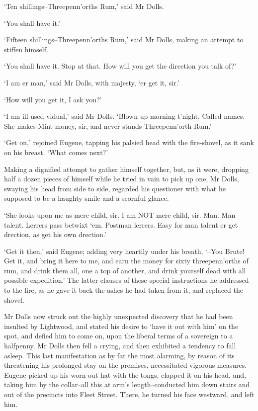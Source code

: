 ‘Ten shillings--Threepenn’orths Rum,’ said Mr Dolls.

‘You shall have it.’

‘Fifteen shillings--Threepenn’orths Rum,’ said Mr Dolls, making an
attempt to stiffen himself.

‘You shall have it. Stop at that. How will you get the direction you
talk of?’

‘I am er man,’ said Mr Dolls, with majesty, ‘er get it, sir.’

‘How will you get it, I ask you?’

‘I am ill-used vidual,’ said Mr Dolls. ‘Blown up morning t’night. Called
names. She makes Mint money, sir, and never stands Threepenn’orth Rum.’

‘Get on,’ rejoined Eugene, tapping his palsied head with the
fire-shovel, as it sank on his breast. ‘What comes next?’

Making a dignified attempt to gather himself together, but, as it were,
dropping half a dozen pieces of himself while he tried in vain to pick
up one, Mr Dolls, swaying his head from side to side, regarded his
questioner with what he supposed to be a haughty smile and a scornful
glance.

‘She looks upon me as mere child, sir. I am NOT mere child, sir. Man.
Man talent. Lerrers pass betwixt ‘em. Postman lerrers. Easy for man
talent er get drection, as get his own drection.’

‘Get it then,’ said Eugene; adding very heartily under his breath,
‘--You Brute! Get it, and bring it here to me, and earn the money for
sixty threepenn’orths of rum, and drink them all, one a top of another,
and drink yourself dead with all possible expedition.’ The latter
clauses of these special instructions he addressed to the fire, as he
gave it back the ashes he had taken from it, and replaced the shovel.

Mr Dolls now struck out the highly unexpected discovery that he had been
insulted by Lightwood, and stated his desire to ‘have it out with him’
on the spot, and defied him to come on, upon the liberal terms of
a sovereign to a halfpenny. Mr Dolls then fell a crying, and then
exhibited a tendency to fall asleep. This last manifestation as by far
the most alarming, by reason of its threatening his prolonged stay
on the premises, necessitated vigorous measures. Eugene picked up his
worn-out hat with the tongs, clapped it on his head, and, taking him by
the collar--all this at arm’s length--conducted him down stairs and out
of the precincts into Fleet Street. There, he turned his face westward,
and left him.

